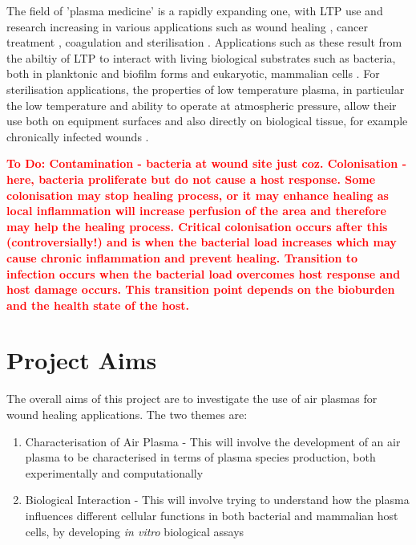 \documentclass[11pt, oneside]{article}   	%
\newcommand{\todo}[1]{ \textcolor{red}{\bf{To Do:} #1}}
\begin{document}
The field of 'plasma medicine' is a rapidly expanding one, with LTP use and research increasing in various applications such as wound healing \cite{Haertel2014nonthermal, Isbary2013nonthermal}, cancer treatment \cite{Hirst2016low, Fridman2007floating}, coagulation \cite{Fridman2006blood, Chen2009blood} and sterilisation \cite{Fridman2006blood, Laroussi2002nonthermal}.
Applications such as these result from the abiltiy of LTP to interact with living biological substrates such as bacteria, both in planktonic and biofilm forms \cite{Joshi2010control, Pei2012inactivation, Ziuzina2015cold} and eukaryotic, mammalian cells \cite{Haertel2014nonthermal}.
For sterilisation applications, the properties of low temperature plasma, in particular the low temperature and ability to operate at atmospheric pressure, allow their use both on equipment surfaces \cite{Laroussi2002nonthermal} and also directly on biological tissue, for example chronically infected wounds \cite{Haertel2014nonthermal, Isbary2013nonthermal, Fridman2006blood}.

\todo{Contamination - bacteria at wound site just coz. Colonisation - here, bacteria proliferate but do not cause a host response. Some colonisation may stop healing process, or it may enhance healing as local inflammation will increase perfusion of the area and therefore may help the healing process. Critical colonisation occurs after this (controversially!) and is when the bacterial load increases which may cause chronic inflammation and prevent healing. Transition to infection occurs when the bacterial load overcomes host response and host damage occurs. This transition point depends on the bioburden and the health state of the host.}

\section{Project Aims}
The overall aims of this project are to investigate the use of air plasmas for wound healing applications.
The two themes are:
\begin{enumerate}
\item Characterisation of Air Plasma - This will involve the development of an air plasma to be characterised in terms of plasma species production, both experimentally and computationally
\item Biological Interaction - This will involve trying to understand how the plasma influences different cellular functions in both bacterial and mammalian host cells, by developing \textit{in vitro} biological assays
\end{enumerate}
\end{document}

